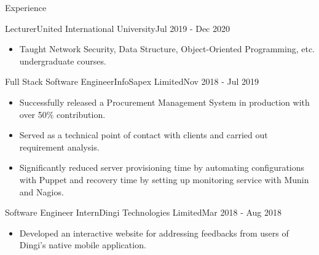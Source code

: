 \documentclass[]{mcdowellcv}
\begin{document}
\begin{cvsection}{Experience}
		\begin{cvsubsection}{Lecturer}{United International University}{Jul 2019 - Dec 2020}
			\begin{itemize}
				\item Taught Network Security, Data Structure, Object-Oriented Programming, etc. undergraduate courses.
			\end{itemize}
		\end{cvsubsection}
		
		\begin{cvsubsection}{Full Stack Software Engineer}{InfoSapex Limited}{Nov 2018 - Jul 2019}
			\begin{itemize}
				\item Successfully released a Procurement Management System in production with over 50\% contribution.
				\item Served as a technical point of contact with clients and carried out requirement analysis.
				\item Significantly reduced server provisioning time by automating configurations with Puppet and recovery time by setting up monitoring service with Munin and Nagios.
			\end{itemize}
		\end{cvsubsection}
		
		\begin{cvsubsection}{Software Engineer Intern}{Dingi Technologies Limited}{Mar 2018 - Aug 2018}
			\begin{itemize}
				\item Developed an interactive website for addressing feedbacks from users of Dingi's native mobile application.
			\end{itemize}
		\end{cvsubsection}
	\end{cvsection}
	
\end{document}
